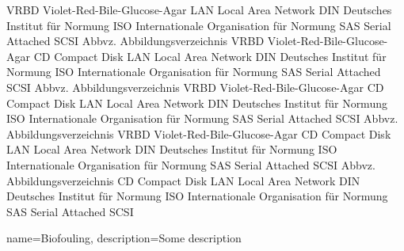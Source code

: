   {VRBD}   {Violet-Red-Bile-Glucose-Agar}
   {LAN}    {Local Area Network}
   {DIN}    {Deutsches Institut für Normung}
   {ISO}    {Internationale Organisation für Normung}
   {SAS}    {Serial Attached SCSI}
 {Abbvz.} {Abbildungsverzeichnis}
    {VRBD}   {Violet-Red-Bile-Glucose-Agar}
    {CD}     {Compact Disk}
    {LAN}    {Local Area Network}
    {DIN}    {Deutsches Institut für Normung}
    {ISO}    {Internationale Organisation für Normung}
    {SAS}    {Serial Attached SCSI}
    {Abbvz.} {Abbildungsverzeichnis}
    {VRBD}   {Violet-Red-Bile-Glucose-Agar}
    {CD}     {Compact Disk}
    {LAN}    {Local Area Network}
    {DIN}    {Deutsches Institut für Normung}
    {ISO}    {Internationale Organisation für Normung}
    {SAS}    {Serial Attached SCSI}
    {Abbvz.} {Abbildungsverzeichnis}
    {VRBD}   {Violet-Red-Bile-Glucose-Agar}
    {CD}     {Compact Disk}
    {LAN}    {Local Area Network}
    {DIN}    {Deutsches Institut für Normung}
    {ISO}    {Internationale Organisation für Normung}
    {SAS}    {Serial Attached SCSI}
    {Abbvz.} {Abbildungsverzeichnis}
    {CD}     {Compact Disk}
    {LAN}    {Local Area Network}
    {DIN}    {Deutsches Institut für Normung}
    {ISO}    {Internationale Organisation für Normung}
    {SAS}    {Serial Attached SCSI}


     {
        name=Biofouling,
        description={Some description}}
    
